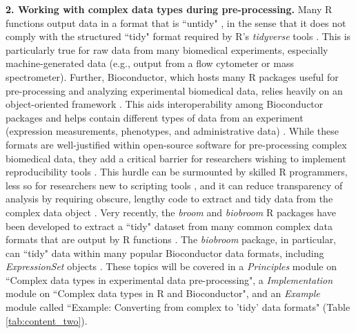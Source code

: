 \documentclass[pdftex,english,11.5pt,parskip=half]{scrartcl}
\begin{document}
\textbf{2. Working with complex data types during pre-processing.} Many R functions output data in a format that is ``untidy" \cite{robinson2014broom}, in the sense that it does not comply with the structured ``tidy" format required by R's \textit{tidyverse} tools \cite{wickham2014tidy}. This is particularly true for raw data from many biomedical experiments, especially machine-generated data (e.g., output from a flow cytometer or mass spectrometer). Further, Bioconductor, which hosts many R packages useful for pre-processing and analyzing experimental biomedical data, relies heavily on an object-oriented framework \cite{gentleman2004bioconductor}.  This aids interoperability among Bioconductor packages and helps contain different types of data from an experiment (expression measurements, phenotypes, and administrative data) \cite{gentleman2004bioconductor}. While these formats are well-justified within open-source software for pre-processing complex biomedical data, they add a critical barrier for researchers wishing
to implement reproducibility tools \cite{robinson2014broom}. This hurdle can be surmounted by skilled R programmers, less so for researchers new to scripting tools \cite{robinson2014broom}, and it can reduce transparency of analysis by requiring obscure, lengthy code to extract and tidy data from the complex data object \cite{robinson2014broom}. Very recently, the \textit{broom} and \textit{biobroom} R packages have been developed 
to extract a ``tidy" dataset from many common complex data formats that are output by R functions \cite{robinson2014broom, biobroom}.
The \textit{biobroom} package, in particular, can ``tidy" data within many popular Bioconductor data formats, including \textit{ExpressionSet} objects \cite{biobroom}. These topics will be covered in a \textit{Principles} module on ``Complex data types in
experimental data pre-processing", a \textit{Implementation} module on ``Complex
data types in R and Bioconductor", and an \textit{Example} module called
``Example: Converting from complex to 'tidy' data formats" (Table \ref*{tab:content_two}).
\end{document}
